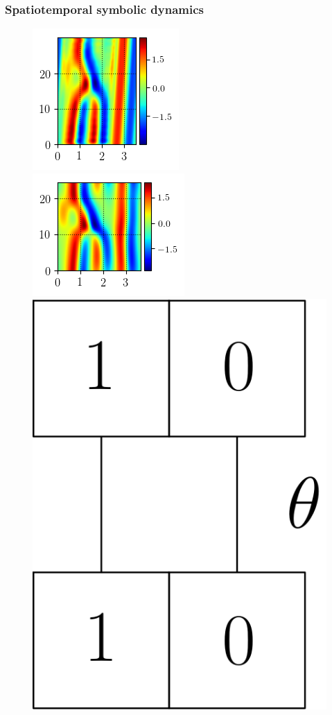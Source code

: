 \documentclass[mathserif, handout]{beamer}
\begin{document}
\begin{frame}%
  \frametitle{Spatiotemporal symbolic dynamics}
\begin{figure}
\includegraphics[width=.25\textwidth,height=.25\textheight]{MNG_HOD_STREAK_init}
\includegraphics[width=.25\textwidth,height=.25\textheight]{MNG_HOD_STREAK_final}
\includegraphics[width=.25\textwidth,height=.25\textheight]{MNG_symb1100rot}
\end{figure}
\end{frame}
\end{document}
